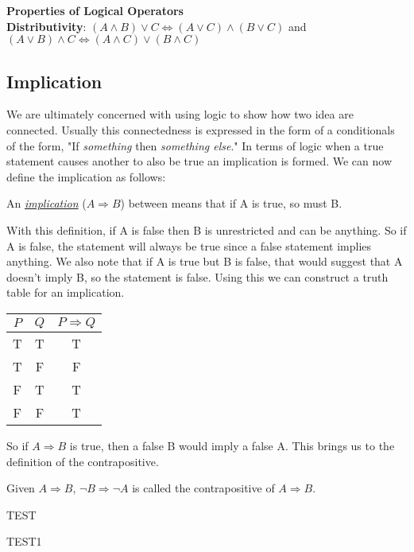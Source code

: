 \begin{thm}
	\textbf{Properties of Logical Operators}\\
	\label{thm:proplogical}
	\textbf{Distributivity}: $(A \land B) \lor C \iff (A \lor C) \land (B \lor C)$ and $(A \lor B) \land C \iff (A \land C) \lor (B \land C)$
	
\end{thm}

\subsection{Implication}
We are ultimately concerned with using logic to show how two idea are connected.
Usually this connectedness is expressed in the form of a conditionals of the form, "If \emph{something} then \emph{something else}."
In terms of logic when a true statement causes another to also be true an implication is formed.
We can now define the implication as follows:

\begin{defn}
	An \emph{\underline{implication}} ($A \Rightarrow B$) between means that if A is true, so must B.
\end{defn}
With this definition, if A is false then B is unrestricted and can be anything.
So if A is false, the statement will always be true since a false statement implies anything.
We also note that if A is true but B is false, that would suggest that A doesn't imply B, so the statement is false.
Using this we can construct a truth table for an implication.

\begin{center}
	\begin{tabular}{cc|c}
		$P$ & $Q$ & $P \Rightarrow Q$ \\
		\hline
		T & T & T \\
		T & F & F \\
		F & T & T \\
		F & F & T \\
	\end{tabular}
\end{center}

So if $A \Rightarrow B$ is true, then a false B would imply a false A.
This brings us to the definition of the contrapositive.

\begin{defn}
	Given $A \Rightarrow B$, $\neg B \Rightarrow \neg A$ is called the contrapositive of $A \Rightarrow B$.
\end{defn}


\begin{exe}
    TEST
    \begin{soln}
        TEST1
    \end{soln}
\end{exe}
